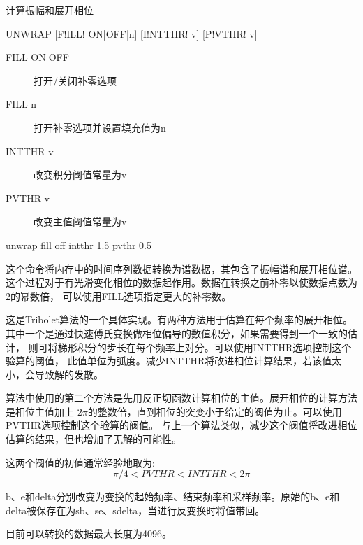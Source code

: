 \label{cmd:unwrap}

计算振幅和展开相位

\begin{SACSTX}
UNWRAP [F!ILL! ON|OFF|n] [I!NTTHR! v] [P!VTHR! v]
\end{SACSTX}

\begin{description}
\item [FILL ON|OFF] 打开/关闭补零选项
\item [FILL n] 打开补零选项并设置填充值为n
\item [INTTHR v] 改变积分阈值常量为v
\item [PVTHR v] 改变主值阈值常量为v
\end{description}

\begin{SACDFT}
unwrap fill off intthr 1.5 pvthr 0.5
\end{SACDFT}

这个命令将内存中的时间序列数据转换为谱数据，其包含了振幅谱和展开相位谱。
这个过程对于有光滑变化相位的数据起作用。数据在转换之前补零以使数据点数为2的幂数倍，
可以使用FILL选项指定更大的补零数。

这是Tribolet算法的一个具体实现。有两种方法用于估算在每个频率的展开相位。
其中一个是通过快速傅氏变换做相位偏导的数值积分，如果需要得到一个一致的估计，
则可将梯形积分的步长在每个频率上对分。可以使用INTTHR选项控制这个验算的阈值，
此值单位为弧度。减少INTTHR将改进相位计算结果，若该值太小，会导致解的发散。

算法中使用的第二个方法是先用反正切函数计算相位的主值。展开相位的计算方法是相位主值加上
$2\pi$的整数倍，直到相位的突变小于给定的阀值为止。可以使用PVTHR选项控制这个验算的阀值。
与上一个算法类似，减少这个阀值将改进相位估算的结果，但也增加了无解的可能性。

这两个阀值的初值通常经验地取为:
\[ \pi/4 < PVTHR < INTTHR < 2\pi \]

b、e和delta分别改变为变换的起始频率、结束频率和采样频率。原始的b、e和delta被保存在为sb、se、sdelta，当进行反变换时将值带回。

目前可以转换的数据最大长度为4096。
